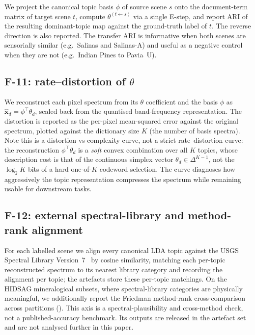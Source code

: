 \documentclass[journal,a4paper,10pt]{IEEEtran}
\begin{document}
We project the canonical topic basis $\phi$ of source scene $s$ onto
the document-term matrix of target scene $t$, compute
$\theta^{(t \leftarrow s)}$ via a single E-step, and report ARI of
the resulting dominant-topic map against the ground-truth label of
$t$. The reverse direction is also reported. The transfer ARI is
informative when both scenes are sensorially similar (e.g.\ Salinas
and Salinas-A) and useful as a negative control when they are not
(e.g.\ Indian Pines to Pavia~U).

\subsection{F-11: rate--distortion of \texorpdfstring{$\theta$}{theta}}

We reconstruct each pixel spectrum from its $\theta$ coefficient and
the basis $\phi$ as $\hat{\mathbf{x}}_d = \phi^\top \theta_d$, scaled
back from the quantised band-frequency representation. The
distortion is reported as the per-pixel mean-squared error against the
original spectrum, plotted against the dictionary size $K$ (the number
of basis spectra). Note this is a distortion-vs-complexity curve, not a
strict rate--distortion curve: the reconstruction $\phi^\top\theta_d$ is a
\emph{soft} convex combination over all $K$ topics, whose description cost
is that of the continuous simplex vector $\theta_d \in \Delta^{K-1}$, not
the $\log_2 K$ bits of a hard one-of-$K$ codeword selection. The
curve diagnoses how aggressively the topic representation compresses
the spectrum while remaining usable for downstream tasks.

\subsection{F-12: external spectral-library and method-rank alignment}

For each labelled scene we align every canonical LDA topic against the
USGS Spectral Library Version~7~\cite{kokaly2017splib07} by cosine
similarity, matching each per-topic reconstructed spectrum to its
nearest library category and recording the alignment per topic; the
 artefacts store
these per-topic matchings. On the HIDSAG mineralogical subsets, where
spectral-library categories are physically meaningful, we additionally
report the Friedman method-rank cross-comparison across partitions
(). This axis is a
spectral-plausibility and cross-method check, not a published-accuracy
benchmark. Its outputs are released in the artefact set and are not
analysed further in this paper.
\end{document}
